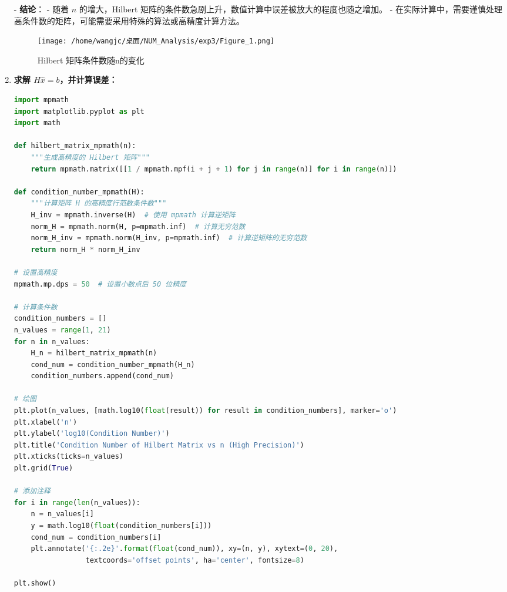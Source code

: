 \documentclass{article}
\begin{document}
\begin{enumerate}[itemsep=1em]
            - \textbf{结论}：
            - 随着 \( n \) 的增大，Hilbert 矩阵的条件数急剧上升，数值计算中误差被放大的程度也随之增加。
            - 在实际计算中，需要谨慎处理高条件数的矩阵，可能需要采用特殊的算法或高精度计算方法。
            \begin{figure}[h] %
                  \centering %
                  \texttt{[image: /home/wangjc/桌面/NUM\_Analysis/exp3/Figure\_1.png]} %
                  \caption{Hilbert 矩阵条件数随n的变化} %
                  \label{fig:Hilbert 矩阵条件数随n的变化} %
            \end{figure}
      \item \textbf{求解 \( H \hat{x} = b \)，并计算误差：}

            \begin{lstlisting}[language=Python]
import mpmath
import matplotlib.pyplot as plt
import math

def hilbert_matrix_mpmath(n):
    """生成高精度的 Hilbert 矩阵"""
    return mpmath.matrix([[1 / mpmath.mpf(i + j + 1) for j in range(n)] for i in range(n)])

def condition_number_mpmath(H):
    """计算矩阵 H 的高精度行范数条件数"""
    H_inv = mpmath.inverse(H)  # 使用 mpmath 计算逆矩阵
    norm_H = mpmath.norm(H, p=mpmath.inf)  # 计算无穷范数
    norm_H_inv = mpmath.norm(H_inv, p=mpmath.inf)  # 计算逆矩阵的无穷范数
    return norm_H * norm_H_inv

# 设置高精度
mpmath.mp.dps = 50  # 设置小数点后 50 位精度

# 计算条件数
condition_numbers = []
n_values = range(1, 21)
for n in n_values:
    H_n = hilbert_matrix_mpmath(n)
    cond_num = condition_number_mpmath(H_n)
    condition_numbers.append(cond_num)

# 绘图
plt.plot(n_values, [math.log10(float(result)) for result in condition_numbers], marker='o')
plt.xlabel('n')
plt.ylabel('log10(Condition Number)')
plt.title('Condition Number of Hilbert Matrix vs n (High Precision)')
plt.xticks(ticks=n_values)
plt.grid(True)

# 添加注释
for i in range(len(n_values)):
    n = n_values[i]
    y = math.log10(float(condition_numbers[i]))
    cond_num = condition_numbers[i]
    plt.annotate('{:.2e}'.format(float(cond_num)), xy=(n, y), xytext=(0, 20),
                 textcoords='offset points', ha='center', fontsize=8)

plt.show()

    \end{lstlisting}


\end{enumerate}
\end{document}
